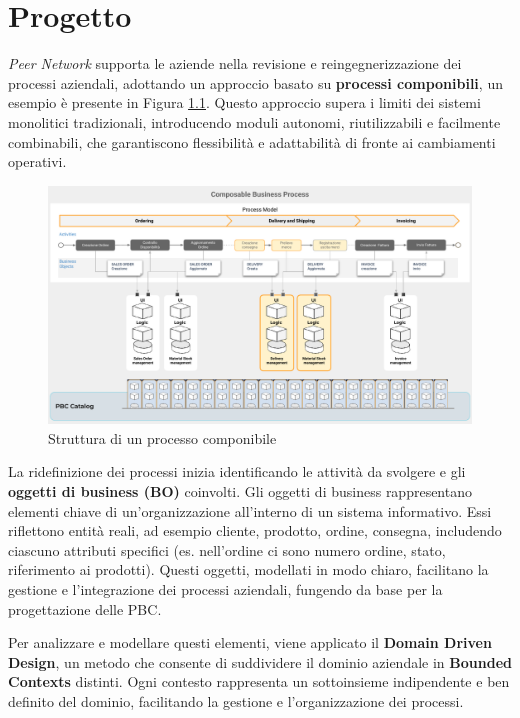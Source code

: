 \chapter{Progetto}
\label{chap:project}

\textit{Peer Network} supporta le aziende nella revisione e reingegnerizzazione dei processi aziendali, adottando un
approccio basato su \textbf{processi componibili}, un esempio è presente in Figura \ref{fig:composable-process}. Questo approccio
supera i limiti dei sistemi monolitici tradizionali, introducendo moduli autonomi, riutilizzabili e facilmente
combinabili, che garantiscono flessibilità e adattabilità di fronte ai cambiamenti operativi.

\begin{figure}
    \centering
    \includegraphics[width=\linewidth]{figures/composable_process.pdf}
    \caption{Struttura di un processo componibile}
    \label{fig:composable-process}
\end{figure}

La ridefinizione dei processi inizia identificando le attività da svolgere e gli \textbf{oggetti di business (BO)} coinvolti.
Gli oggetti di business rappresentano elementi chiave di un’organizzazione all’interno di un sistema informativo. Essi
riflettono entità reali, ad esempio cliente, prodotto, ordine, consegna, includendo ciascuno attributi specifici
(es. nell’ordine ci sono numero ordine, stato, riferimento ai prodotti). Questi oggetti, modellati in modo chiaro,
facilitano la gestione e l’integrazione dei processi aziendali, fungendo da base per la progettazione delle \ac{PBC}.

Per analizzare e modellare questi elementi, viene applicato il \textbf{Domain Driven Design}\cite{evans2004domain}, un metodo che consente di
suddividere il dominio aziendale in \textbf{Bounded Contexts} distinti. Ogni contesto rappresenta un sottoinsieme indipendente
e ben definito del dominio, facilitando la gestione e l’organizzazione dei processi.

